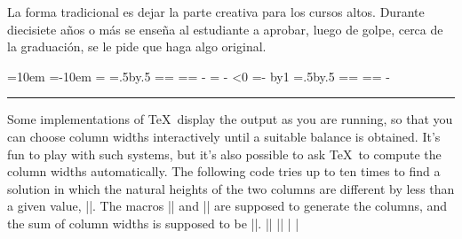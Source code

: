 {{{{{{{{\item{}La forma tradicional es dejar la parte creativa para los cursos
altos. Durante diecisiete a\~nos o m\'as se ense\~na al es\-tu\-diante a
aprobar, luego de golpe, cerca de la graduaci\'on, se le pide que haga
algo original.
}
\newif\iffail \newdimen\doublewidth \newdimen\delheight
\newcount\n
\newdimen\trialwidth \newdimen\lowwidth \newdimen\highwidth
{}
\def\balancetwocols{\lowwidth=10em %
  \highwidth=\doublewidth \advance\highwidth-10em %
  {\n=1 \hbadness=10000 \hfuzz=\maxdimen
    \loop \maketrial
    \wlog{trial \the\n, \the\trialwidth: (\the\ht0,\the\ht2)}
    \testfailure \iffail \preparenewtrial \repeat}
  \maketrial} %
\def\maketrial{%
  \trialwidth=.5\lowwidth \advance\trialwidth by.5\highwidth
  \setbox0=\vbox{\hsize=\trialwidth \firstcol}
  \setbox2=\vbox{\hsize=\doublewidth
    \advance\hsize-\trialwidth \secondcol}}
\def\testfailure{\dimen0=\ht0 \advance\dimen0-\ht2
  \ifnum\dimen0<0 \dimen0=-\dimen0 \fi
  \ifdim\dimen0>\delheight \ifnum\n=10 \failfalse\else\failtrue\fi
  \else\failfalse\fi}
\def\preparenewtrial{\ifdim\ht0>\ht2 \global\lowwidth=\trialwidth
  \else\global\highwidth=\trialwidth\fi \advance\n by1 }
\doublewidth=27pc \delheight=0pt
\balancetwocols
{}
\endgroup
\smallskip
\hrule
\medskip
Some implementations of \TeX\ display the output as you are running,
so that you can choose column widths interactively until a suitable
balance is obtained. It's fun to play with such systems, but it's also
possible to ask \TeX\ to compute the column widths automatically. The
following code tries up to ten times to find a solution in which the
natural heights of the two columns are different by less than
a given value, |\delheight|. The macros |\firstcol| and
|\secondcol| are supposed to generate the columns, and the sum
of column widths is supposed to be |\doublewidth|.
\beginlines
|\newdimen\doublewidth \newdimen\delheight \newif\iffail \newcount\n|
|\newdimen\trialwidth \newdimen\lowwidth \newdimen\highwidth|
|\def\balancetwocols{\lowwidth=10em %
|  \highwidth=\doublewidth \advance\highwidth-10em %
|  {\n=1 \hbadness=10000 \hfuzz=\maxdimen %
|    \loop \maketrial \testfailure \iffail \preparenewtrial \repeat}|
|  \maketrial} %
|\def\maketrial{\trialwidth=.5\lowwidth \advance\trialwidth by.5\highwidth|
|  \setbox0=\vbox{\hsize=\trialwidth \firstcol}|
}}}}}}}}
